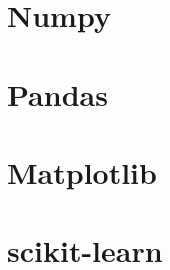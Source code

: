 \documentclass{article}
\begin{document}
\section{Numpy}

\section{Pandas}

\section{Matplotlib}

\section{scikit-learn}
    
\end{document}
